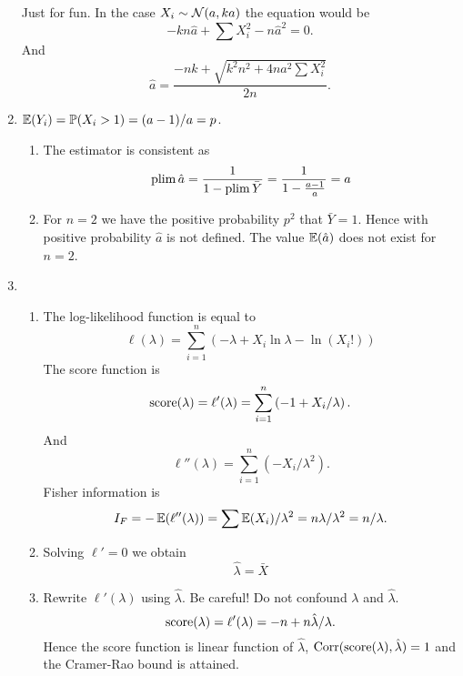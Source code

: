\begin{enumerate}
Just for fun. 
In the case $X_i \sim \mathcal{N}(a, ka)$ the equation would be
\[
-kn\hat a + \sum X_i^2 - n\hat a^2 = 0.    
\]
And 
\[
\hat a = \frac{-nk + \sqrt{k^2 n^2  + 4na^2 \sum X_i^2}}{2n}.    
\]



\item $\operatorname{\mathbb{E}}(Y_i) = \operatorname{\mathbb{P}}(X_i > 1) = (a-1) / a = p$.
\begin{enumerate}
    \item The estimator is consistent as
\[
\operatorname*{plim} \hat a = \frac {1}{1- \operatorname*{plim} \bar Y } = \frac{1}{1 - \frac{a-1}{a}} = a
\]
\item 
For $n=2$ we have the positive probability $p^2$ that $\bar Y = 1$.
Hence with positive probability $\hat a$ is not defined.
The value $\operatorname{\mathbb{E}}(\hat a)$ does not exist for $n=2$.
\end{enumerate}

\item 
\begin{enumerate}
\item The log-likelihood function is equal to
\[
\ell(\lambda) = \sum_{i=1}^n \left( -\lambda + X_i \ln \lambda - \ln (X_i!)\right)    
\]
The score function is 
\[
\mathrm{score}(\lambda) = \ell'(\lambda) = \sum_{i=1}^n \left( -1 + X_i / \lambda\right).
\]
And
\[
\ell''(\lambda) = \sum_{i=1}^n \left(- X_i / \lambda^2 \right).
\]
Fisher information is 
\[
I_F = -\operatorname{\mathbb{E}}(\ell''(\lambda)) = \sum \operatorname{\mathbb{E}}(X_i) / \lambda^2 = n\lambda / \lambda^2 = n/\lambda.    
\]

\item Solving $\ell' = 0$ we obtain 
\[
\hat \lambda = \bar X    
\] 

\item Rewrite $\ell'(\lambda)$ using $\hat\lambda$. 
Be careful! Do not confound $\lambda$ and $\hat\lambda$. 
\[
\mathrm{score}(\lambda) = \ell'(\lambda) = -n + n \hat \lambda / \lambda.
\]
Hence the score function is linear function of $\hat\lambda$, $\operatorname{Corr}(\mathrm{score}(\lambda), \hat\lambda) = 1$
and the Cramer-Rao bound is attained. 

\end{enumerate}


\end{enumerate}
